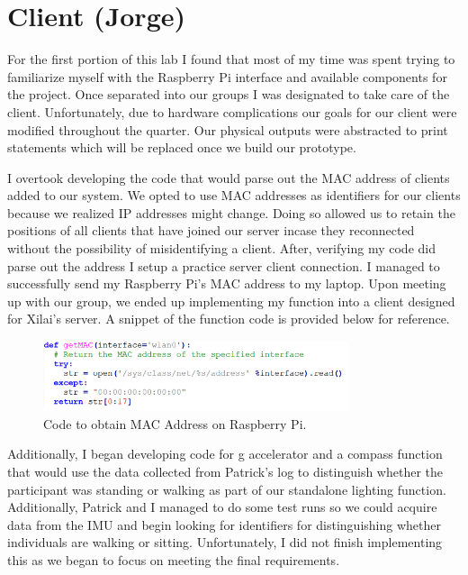 \documentclass[a4paper,10pt]{article}
\begin{document}
\section{Client (Jorge)}
For the first portion of this lab I found that most of my time was spent trying to familiarize myself with the Raspberry Pi interface and available components for the project. Once separated into our groups I was designated to take care of the client. Unfortunately, due to hardware complications our goals for our client were modified throughout the quarter. Our physical outputs were abstracted to print statements which will be replaced once we build our prototype. 

    I overtook developing the code that would parse out the MAC address of clients added to our system. We opted to use MAC addresses as identifiers for our clients because we realized IP addresses might change. Doing so allowed us to retain the positions of all clients that have joined our server incase they reconnected without the possibility of misidentifying a client. After, verifying my code did parse out the address I setup a practice server client connection. I managed to successfully send my Raspberry Pi's MAC address to my laptop. Upon meeting up with our group, we ended up implementing my function into a client designed for Xilai's server. A snippet of the function code is provided below for reference.

\begin{figure}[H]
  \centering
      \includegraphics[width=0.8\textwidth]{Assets/MAC_ADDR.png}
  \caption{Code to obtain MAC Address on Raspberry Pi.}
\end{figure}

Additionally, I began developing code for g accelerator and a compass function that would use the data collected from Patrick's log to distinguish whether the participant was standing or walking as part of our standalone lighting function. Additionally, Patrick and I managed to do some test runs so we could acquire data from the IMU and begin looking for identifiers for distinguishing whether individuals are walking or sitting. Unfortunately, I did not finish implementing this as we began to focus on meeting the final requirements.
\end{document}
